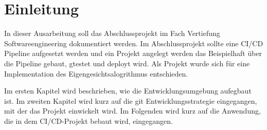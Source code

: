 \chapter{Einleitung}

In dieser Ausarbeitung soll das Abschlussprojekt im Fach \glqq Vertiefung Softwareengineering\grqq{} dokumentiert werden. Im Abschlussprojekt sollte eine \ac{CI/CD} Pipeline aufgesetzt werden und ein Projekt angelegt werden das Beispielhaft über die Pipeline gebaut, gtestet und deployt wird. Als Projekt wurde sich für eine Implementation des Eigengesichtsalogrithmus entschieden. 

Im ersten Kapitel wird beschrieben, wie die Entwicklungsumgebung aufegbaut ist. Im zweiten Kapitel wird kurz auf die git Entwicklungsstrategie eingegangen, mit der das Projekt einwickelt wird. Im Folgenden wird kurz auf die Anwendung, die in dem \ac{CI/CD}-Projekt bebaut wird, eingegangen.